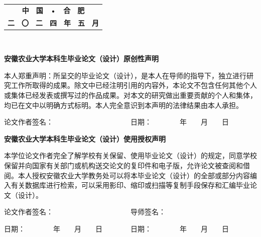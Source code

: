 \documentclass[UTF8,a4paper,12pt]{ctexart}
\begin{document}
	\vspace{4cm} 
	\begin{table}[!h]
		\renewcommand\arraystretch{2}
		\setlength\tabcolsep{16pt}
		\centering
		\begin{tabular}{c}
			\textbf{\fontsize{16pt}{\baselineskip}\heiti 中　国　•　合　肥 }\\
			\textbf{\fontsize{16pt}{\baselineskip}\heiti 二　〇　二　四　年　五　月} \\
		\end{tabular}
	\end{table}
	\thispagestyle{empty}
	\newpage　
	\vspace{1cm} \par \textbf{\fontsize{18pt}{\baselineskip}\heiti 安徽农业大学本科生毕业论文（设计）原创性声明}
	\vspace{1cm} \par 本人郑重声明：所呈交的毕业论文（设计），是本人在导师的指导下，独立进行研究工作所取得的成果。除文中已经注明引用的内容外，本论文不包含任何其他个人或集体已经发表或撰写过的作品成果。对本文的研究做出重要贡献的个人和集体，均已在文中以明确方式标明。本人完全意识到本声明的法律结果由本人承担。
	\vspace{1cm} \par 论文作者签名：　　　　　　　　　　　日期：　　　　年　　月　　日
	\vspace{6cm} \par \textbf{\fontsize{18pt}{\baselineskip}\heiti  安徽农业大学本科生毕业论文（设计）使用授权声明}
	\vspace{1cm} \par 本学位论文作者完全了解学校有关保留、使用毕业论文（设计）的规定，同意学校保留并向国家有关部门或机构送交论文的复印件和电子版，允许论文被查阅和借阅。本人授权安徽农业大学教务处可以将本毕业论文（设计）的全部或部分内容编入有关数据库进行检索，可以采用影印、缩印或扫描等复制手段保存和汇编毕业论文（设计）。
	\vspace{1cm} \par 论文作者签名：　　　　　　　　　　　导师签名：
	\vspace{0.5cm} \par 日期：　　　　年　　月　　日　　　　日期：　　　　年　　月　　日
	\thispagestyle{empty}
	
	\newpage
	
\end{document}
